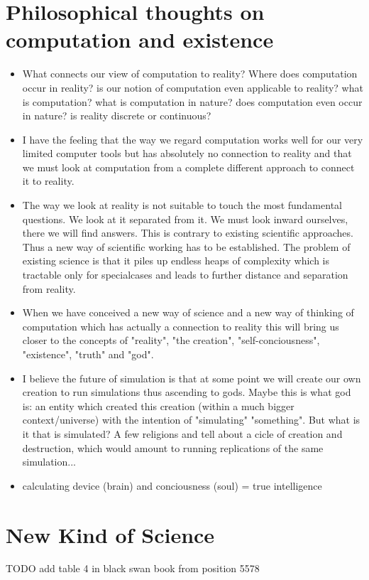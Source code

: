 \documentclass{article}
\begin{document}
\section{Philosophical thoughts on computation and existence}
\begin{itemize}
\item What connects our view of computation to reality? Where does computation occur in reality? is our notion of computation even applicable to reality? what is computation? what is computation in nature? does computation even occur in nature? is reality discrete or continuous?
\item I have the feeling that the way we regard computation works well for our very limited computer tools but has absolutely no connection to reality and that we must look at computation from a complete different approach to connect it to reality.
\item The way we look at reality is not suitable to touch the most fundamental questions. We look at it separated from it. We must look inward ourselves, there we will find answers. This is contrary to existing scientific approaches. Thus a new way of scientific working has to be established. The problem of existing science is that it piles up endless heaps of complexity which is tractable only for specialcases and leads to further distance and separation from reality.
\item When we have conceived a new way of science and a new way of thinking of computation which has actually a connection to reality this will bring us closer to the concepts of "reality", "the creation", "self-conciousness", "existence", "truth" and "god".
\item I believe the future of simulation is that at some point we will create our own creation to run simulations thus ascending to gods. Maybe this is what god is: an entity which created this creation (within a much bigger context/universe) with the intention of "simulating" "something". But what is it that is simulated? A few religions and tell about a cicle of creation and destruction, which would amount to running replications of the same simulation... 
\item calculating device (brain) and conciousness (soul) = true intelligence
\end{itemize}


\section{New Kind of Science}
TODO add table 4 in black swan book from position 5578
\end{document}

